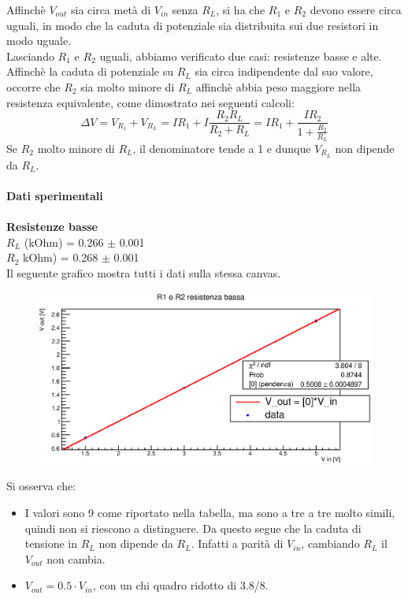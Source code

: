     Affinchè $V_{out}$ sia circa metà di $V_{in}$ senza $R_L$, si ha che $R_1$ e $R_2$ devono essere circa uguali, in modo che la caduta di potenziale sia distribuita sui due resistori in modo uguale.\\
    Lasciando $R_1$ e $R_2$ uguali, abbiamo verificato due casi: resistenze basse e alte.\\
    Affinchè la caduta di potenziale su $R_L$ sia circa indipendente dal suo valore, occorre che $R_2$ sia molto minore di $R_L$ affinchè abbia peso maggiore nella resistenza equivalente, come dimostrato nei seguenti calcoli:
    $$ \Delta V = V_{R_1} + V_{R_L} = I R_1 + I \frac{R_2 R_L}{R_2 + R_L} = I R_1 + \frac{I R_2}{1 + \frac{R_2}{R_L}}  $$
    Se $ R_2$ molto minore di $R_L$, il denominatore tende a 1 e dunque $V_{R_L}$ non dipende da $R_L$.\\\\
    \textbf{Dati sperimentali}\\\\
    \textbf{Resistenze basse}\\
    $R_L$ (kOhm) =	0.266	$\pm$ 0.001\\
    $R_2$ kOhm) =	0.268   $\pm$ 0.001\\
    
    Il seguente grafico mostra tutti i dati sulla stessa canvas. 
    \begin{figure}[H]
    \centering
    \includegraphics[scale=.7]{Grafici/C1_P2_partResLow.eps}
    \end{figure}
    Si osserva che:
    \begin{itemize}
        \item  I valori sono 9 come riportato nella tabella, ma sono a tre a tre molto simili, quindi non si riescono a distinguere. Da questo segue che la caduta di tensione in $R_L$ non dipende da $R_L$. Infatti a parità di $V_{in}$, cambiando $R_L$ il $V_{out}$ non cambia.
        \item $V_{out} = 0.5 \cdot V_{in}$, con un chi quadro ridotto di 3.8/8.
    \end{itemize}

